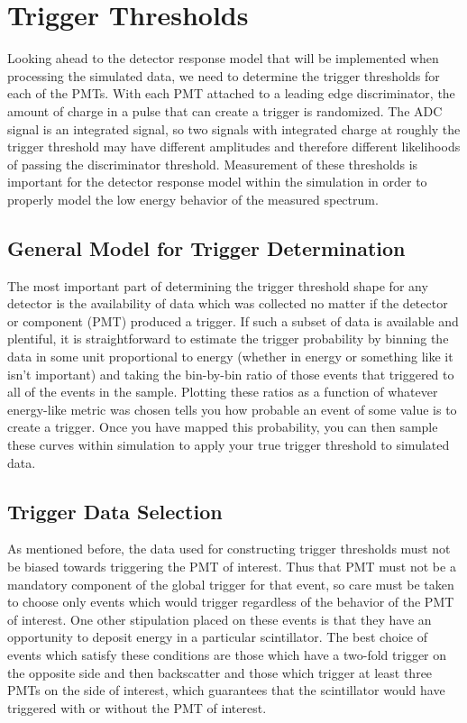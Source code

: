 \section{Trigger Thresholds}

Looking ahead to the detector response model that will be implemented when processing
the simulated data, we need to determine the trigger thresholds for each of the
PMTs. With each PMT attached to a leading edge discriminator, the
amount of charge in a pulse that can create a trigger is randomized. The ADC signal
is an integrated signal, so two signals with integrated charge
at roughly the trigger threshold may have
different amplitudes and therefore different likelihoods of passing the discriminator threshold.
Measurement of these thresholds is important for the detector response model within the simulation
in order to properly model the low energy behavior of the measured spectrum.


\subsection{General Model for Trigger Determination} \label{ssec:genTrigModel}

The most important part of determining the trigger threshold shape for 
any detector is the availability of data which was collected no matter if 
the detector or component (PMT) produced a trigger. If such a subset of 
data is available and plentiful, it is straightforward to estimate
the trigger probability by binning the data in some unit proportional to 
energy (whether in energy or something like it isn't important) and taking 
the bin-by-bin ratio of those events that triggered to all of the events in the 
sample. Plotting these ratios as a function of whatever energy-like metric was chosen tells 
you how probable an event of some value is to create a trigger.
Once you have mapped this probability, you can then sample these curves within 
simulation to apply your true trigger threshold to simulated data.


\subsection{Trigger Data Selection}
As mentioned before, the data used for constructing trigger thresholds must not be 
biased towards triggering the PMT of interest. Thus that PMT must not be a mandatory 
component of the global trigger for that event, so care must be taken to choose only 
events which would trigger regardless of the behavior of the PMT of interest. One
other stipulation placed on these events is that they have an opportunity to 
deposit energy in a particular scintillator. The best choice of events which 
satisfy these conditions are those which have a two-fold trigger on the opposite side 
and then backscatter and those which trigger at least three PMTs on the side of 
interest, which guarantees that the scintillator would have triggered with or without 
the PMT of interest.	

